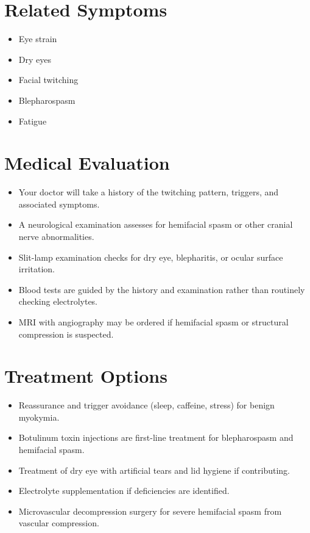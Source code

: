 \section*{Related Symptoms}
\begin{itemize}
  \item Eye strain
  \item Dry eyes
  \item Facial twitching
  \item Blepharospasm
  \item Fatigue
\end{itemize}

\section*{Medical Evaluation}
\begin{itemize}
  \item Your doctor will take a history of the twitching pattern, triggers, and associated symptoms.
  \item A neurological examination assesses for hemifacial spasm or other cranial nerve abnormalities.
  \item Slit-lamp examination checks for dry eye, blepharitis, or ocular surface irritation.
  \item Blood tests are guided by the history and examination rather than routinely checking electrolytes.
  \item MRI with angiography may be ordered if hemifacial spasm or structural compression is suspected.
\end{itemize}

\section*{Treatment Options}
\begin{itemize}
  \item Reassurance and trigger avoidance (sleep, caffeine, stress) for benign myokymia.
  \item Botulinum toxin injections are first-line treatment for blepharospasm and hemifacial spasm.
  \item Treatment of dry eye with artificial tears and lid hygiene if contributing.
  \item Electrolyte supplementation if deficiencies are identified.
  \item Microvascular decompression surgery for severe hemifacial spasm from vascular compression.
\end{itemize}



